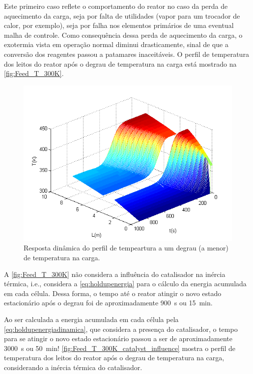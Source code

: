 Este primeiro caso reflete o comportamento do reator no caso da perda de
aquecimento da carga, seja por falta de utilidades (vapor para um trocador de
calor, por exemplo), seja por falha nos elementos primários de uma eventual
malha de controle. Como consequência dessa perda de aquecimento da carga, o
exotermia vista em operação normal diminui drasticamente, sinal de que a
conversão dos reagentes passou a patamares inaceitáveis. O perfil de temperatura
dos leitos do reator após o degrau de temperatura na carga está mostrado na
\autoref{fig:Feed_T_300K}.

\begin{figure}[htb]
\centering
\includegraphics[scale=0.8]{images/Chap4/Feed_T_300K.png}
\caption{Resposta dinâmica do perfil de tempeartura a um degrau (a menor) de
temperatura na carga.}
\label{fig:Feed_T_300K}
\end{figure}

A \autoref{fig:Feed_T_300K} não considera a influência do catalisador na inércia
térmica, i.e., considera a \autoref{eq:holdupenergia} para o cálculo da energia
acumulada em cada célula. Dessa forma, o tempo até o reator atingir o novo
estado estacionário após o degrau foi de aproximadamente \SI{900}{s} ou
\SI{15}{min}.

Ao ser calculada a energia acumulada em cada célula pela
\autoref{eq:holdupenergiadinamica}, que considera a presença do catalisador, o
tempo para se atingir o novo estado estacionário passou a ser de aproximadamente
\SI{3000}{s} ou \SI{50}{min}! \autoref{fig:Feed_T_300K_catalyst_influence}
mostra o perfil de temperatura dos leitos do reator após o degrau de temperatura
na carga, considerando a inércia térmica do catalisador.

